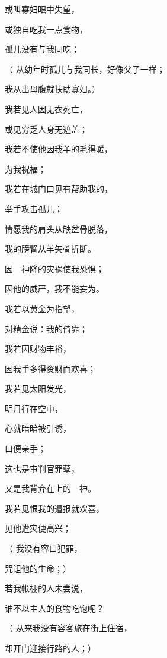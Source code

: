 {\par }{\Q 或叫寡妇眼中失望，
\par }{\Q {}或独自吃我一点食物，
\par }{\Q 孤儿没有与我同吃；
\par }{\Q （
从幼年时孤儿与我同长，好像父子一样；
\par }{\Q 我从出母腹就扶助寡妇。）
\par }{\Q {}我若见人因无衣死亡，
\par }{\Q 或见穷乏人身无遮盖；
\par }{\Q {}我若不使他因我羊的毛得暖，
\par }{\Q 为我祝福；
\par }{\Q {}我若在城门口见有帮助我的，
\par }{\Q 举手攻击孤儿；
\par }{\Q {}情愿我的肩头从缺盆骨脱落，
\par }{\Q 我的膀臂从羊矢骨折断。
\par }{\Q {}因　神降的灾祸使我恐惧；
\par }{\Q 因他的威严，我不能妄为。
\par }{\BB \par }{\Q {}我若以黄金为指望，
\par }{\Q 对精金说：{}我的倚靠；
\par }{\Q {}我若因财物丰裕，
\par }{\Q 因我手多得资财而欢喜；
\par }{\Q {}我若见太阳发光，
\par }{\Q 明月行在空中，
\par }{\Q {}心就暗暗被引诱，
\par }{\Q 口便亲手；
\par }{\Q {}这也是审判官{}罪孽，
\par }{\Q 又是我背弃在上的　神。
\par }{\BB \par }{\Q {}我若见恨我的遭报就欢喜，
\par }{\Q 见他遭灾便高兴；
\par }{\Q （
我没有容口犯罪，
\par }{\Q 咒诅他的生命；）
\par }{\Q {}若我帐棚的人未尝说，
\par }{\Q 谁不以主人的食物吃饱呢？
\par }{\Q （
从来我没有容客旅在街上住宿，
\par }{\Q 却开门迎接行路的人；）
}
